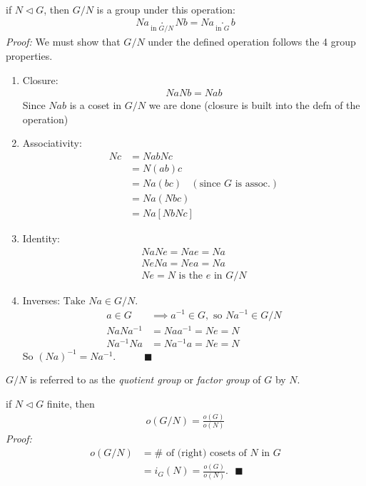\begin{theorem} \hspace{0.01in}\\
if $N\triangleleft G$, then $G/N$ is a group under this operation:
\begin{align}
    Na \underset{\text{in }G/N}{\cdot} Nb = Na \underset{\text{in }G}{\cdot} b \nonumber
\end{align}
\textit{Proof:} We must show that $G/N$ under the defined operation follows the 4 group properties.
\begin{enumerate}[label=\roman*)]
    \item Closure:
    \begin{align}
        NaNb=Nab \nonumber
    \end{align}
    Since $Nab$ is a coset in $G/N$ we are done (closure is built into the defn of the operation)
    \item Associativity:
    \begin{align}
        [NaNb]Nc&=NabNc \nonumber\\
        &= N(ab)c \nonumber \\
        &= Na(bc)  \ \ \ \ (\text{since } G \text{ is assoc.})\nonumber \\
        &= Na(Nbc) \nonumber \\
        &= Na[NbNc] \nonumber
    \end{align}
    \item Identity:
    \begin{align}
        NaNe=Nae=Na\nonumber \\
        NeNa=Nea=Na\nonumber \\
        Ne=N \text{ is the } e \text{ in } G/N \nonumber
    \end{align}
    \item Inverses: $\text{Take }Na\in G/N.$
    \begin{align}
        a\in G &\implies a^{-1} \in G, \text{ so } Na^{-1}\in G/N \nonumber \\
        NaNa^{-1}&=Naa^{-1}=Ne=N \nonumber \\
        Na^{-1}Na&=Na^{-1}a=Ne=N \nonumber 
    \end{align}
    So $(Na)^{-1}=Na^{-1}$. \ \ \ \ \ $\blacksquare$
\end{enumerate}
    
$G/N$ is referred to as the \textit{quotient group} or \textit{factor group} of $G$ by $N$.
\end{theorem}
\begin{lemma}
if $N\triangleleft G$ finite, then
\begin{align}
    o(G/N)=\frac{o(G)}{o(N)}\nonumber
\end{align}
\textit{Proof:}
\begin{align}
    o(G/N)&= \# \text{ of (right) cosets of }N \text{ in }G \nonumber \\
    &= i_G(N)=\frac{o(G)}{o(N)}. \ \ \ \blacksquare \nonumber 
\end{align}
\end{lemma}

